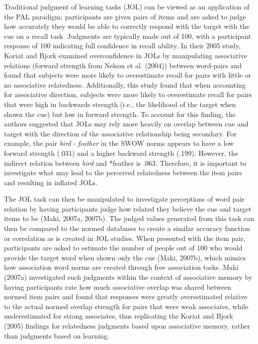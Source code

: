\documentclass[english,,man]{apa6}
\begin{document}
Traditional judgment of learning tasks (JOL) can be viewed as an application of the PAL paradigm; participants are given pairs of items and are asked to judge how accurately they would be able to correctly respond with the target with the cue on a recall task. Judgments are typically made out of 100, with a participant response of 100 indicating full confidence in recall ability. In their 2005 study, Koriat and Bjork examined overconfidence in JOLs by manipulating associative relations (forward strength from Nelson et al. (2004)) between word-pairs and found that subjects were more likely to overestimate recall for pairs with little or no associative relatedness. Additionally, this study found that when accounting for associative direction, subjects were more likely to overestimate recall for pairs that were high in backwards strength (i.e., the likelihood of the target when shown the cue) but low in forward strength. To account for this finding, the authors suggested that JOLs may rely more heavily on overlap between cue and target with the direction of the associative relationship being secondary. For example, the pair \emph{bird} - \emph{feather} in the SWOW norms appears to have a low forward strength (.031) and a higher backward strength (.199). However, the indirect relation between \emph{bird} and *feather is .063. Therefore, it is important to investigate what may lead to the perceived relatedness between the item pairs and resulting in inflated JOLs.

The JOL task can then be manipulated to investigate perceptions of word pair relation by having participants judge how related they believe the cue and target items to be (Maki, 2007a, 2007b). The judged values generated from this task can then be compared to the normed databases to create a similar accuracy function or correlation as is created in JOL studies. When presented with the item pair, participants are asked to estimate the number of people out of 100 who would provide the target word when shown only the cue (Maki, 2007b), which mimics how association word norms are created through free association tasks. Maki (2007a) investigated such judgments within the context of associative memory by having participants rate how much associative overlap was shared between normed item pairs and found that responses were greatly overestimated relative to the actual normed overlap strength for pairs that were weak associates, while underestimated for strong associates, thus replicating the Koriat and Bjork (2005) findings for relatedness judgments based upon associative memory, rather than judgments based on learning.
\end{document}
